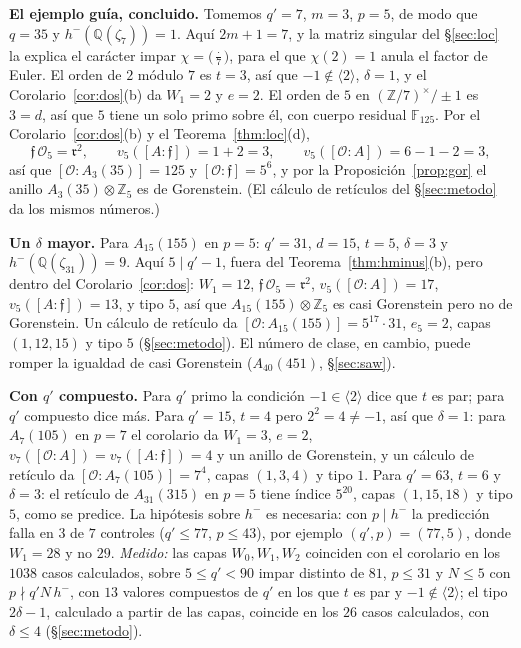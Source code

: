 \documentclass[11pt,a4paper]{article}
\theoremstyle{definition}
\newcommand{\ZZ}{\mathbb{Z}}
\newcommand{\QQ}{\mathbb{Q}}
\newcommand{\FF}{\mathbb{F}}
\newcommand{\cO}{\mathcal{O}}
\newcommand{\cf}{\mathfrak{f}}
\newcommand{\rad}{\mathfrak{r}}
\begin{document}
\noindent\textbf{El ejemplo guía, concluido.} Tomemos $q'=7$, $m=3$, $p=5$, de modo que $q=35$ y $h^-(\QQ(\zeta_7))=1$. Aquí
$2m+1=7$, y la matriz singular del \S\ref{sec:loc} la explica el carácter impar $\chi=\bigl(\frac{\cdot}{7}\bigr)$,
para el que $\chi(2)=1$ anula el factor de Euler. El
orden de $2$ módulo $7$ es $t=3$, así que $-1\notin\langle2\rangle$, $\delta=1$, y el Corolario~\ref{cor:dos}(b) da
$W_1=2$ y $e=2$. El orden de $5$
en $(\ZZ/7)^\times/\pm1$ es $3=d$, así que $5$ tiene un solo primo sobre él, con cuerpo residual $\FF_{125}$. Por el
Corolario~\ref{cor:dos}(b) y el Teorema~\ref{thm:loc}(d),
\[
\cf\,\cO_5=\rad^2,\qquad v_5([A:\cf])=1+2=3,\qquad v_5([\cO:A])=6-1-2=3 ,
\]
así que $[\cO:A_3(35)]=125$ y $[\cO:\cf]=5^6$, y por la Proposición~\ref{prop:gor} el anillo $A_3(35)\otimes\ZZ_5$ es de Gorenstein. (El cálculo de
retículos del \S\ref{sec:metodo} da los mismos números.)

\noindent\textbf{Un $\delta$ mayor.} Para $A_{15}(155)$ en $p=5$: $q'=31$, $d=15$, $t=5$, $\delta=3$ y
$h^-(\QQ(\zeta_{31}))=9$. Aquí $5\mid q'-1$, fuera del Teorema~\ref{thm:hminus}(b), pero dentro del
Corolario~\ref{cor:dos}: $W_1=12$, $\cf\,\cO_5=\rad^2$, $v_5([\cO:A])=17$, $v_5([A:\cf])=13$, y tipo $5$, así que
$A_{15}(155)\otimes\ZZ_5$ es casi Gorenstein pero no de Gorenstein. Un cálculo de retículo da
$[\cO:A_{15}(155)]=5^{17}\cdot31$, $e_5=2$, capas $(1,12,15)$ y tipo $5$ (\S\ref{sec:metodo}). El número de clase, en
cambio, puede romper la igualdad de casi Gorenstein ($A_{40}(451)$, \S\ref{sec:saw}).

\noindent\textbf{Con $q'$ compuesto.} Para $q'$ primo la condición $-1\in\langle2\rangle$ dice que $t$ es par; para $q'$
compuesto dice más. Para $q'=15$, $t=4$ pero $2^2=4\ne-1$, así que $\delta=1$: para $A_7(105)$ en $p=7$ el corolario da
$W_1=3$, $e=2$, $v_7([\cO:A])=v_7([A:\cf])=4$ y un anillo de Gorenstein, y un cálculo de retículo da
$[\cO:A_7(105)]=7^4$, capas $(1,3,4)$ y tipo $1$. Para $q'=63$, $t=6$ y $\delta=3$: el retículo de $A_{31}(315)$ en
$p=5$ tiene índice $5^{20}$, capas $(1,15,18)$ y tipo $5$, como se predice. La hipótesis sobre $h^-$ es necesaria: con
$p\mid h^-$ la predicción falla en $3$ de $7$ controles ($q'\le77$, $p\le43$), por ejemplo $(q',p)=(77,5)$, donde $W_1=28$ y no $29$.
\emph{Medido:} las capas $W_0,W_1,W_2$ coinciden con el corolario en los $1038$ casos calculados, sobre $5\le q'<90$
impar distinto de $81$, $p\le31$ y $N\le5$ con $p\nmid q'N\,h^-$, con $13$ valores compuestos de $q'$ en los que $t$ es par y
$-1\notin\langle2\rangle$; el tipo $2\delta-1$, calculado a partir de las capas, coincide en los $26$ casos calculados, con
$\delta\le4$ (\S\ref{sec:metodo}).
\end{document}
